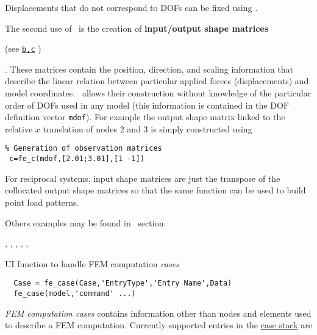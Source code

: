 \noindent Displacements that do not correspond to DOFs can be fixed using \fecoor.


The second use of \fec\ is the creation of {\bf input/output shape matrices} \begin{SDT}(see \hyperlink{bc}{{\tt b,c}} )\end{SDT}.  These matrices contain the position, direction, and scaling information that describe the linear relation between particular applied forces (displacements) and model coordinates. \fec\ allows their construction without knowledge of the particular order of DOFs used in any model (this information is contained in the DOF definition vector {\tt mdof}). For example the output shape matrix linked to the relative $x$ translation of nodes 2 and 3 is simply constructed using

\begin{verbatim}
% Generation of observation matrices
 c=fe_c(mdof,[2.01;3.01],[1 -1])
\end{verbatim}

For reciprocal systems, input shape matrices are just the transpose 
of the collocated output shape matrices so that the same function can 
be used to build point load patterns.


Others examples may be found in \adof\ section.


\noindent \femk, \feplot, \fecoor, \feload, \adof, 
\begin{SDT}
\norss 
\end{SDT}
\newline


UI function to handle FEM computation {\sl cases}

\rsyntax\begin{verbatim}
  Case = fe_case(Case,'EntryType','Entry Name',Data)
  fe_case(model,'command' ...)
\end{verbatim}\nlvs



{\sl FEM computation cases} contains information other than nodes and elements used to describe a FEM computation. Currently supported entries in the \hyperlink{stackref}{case stack} are


